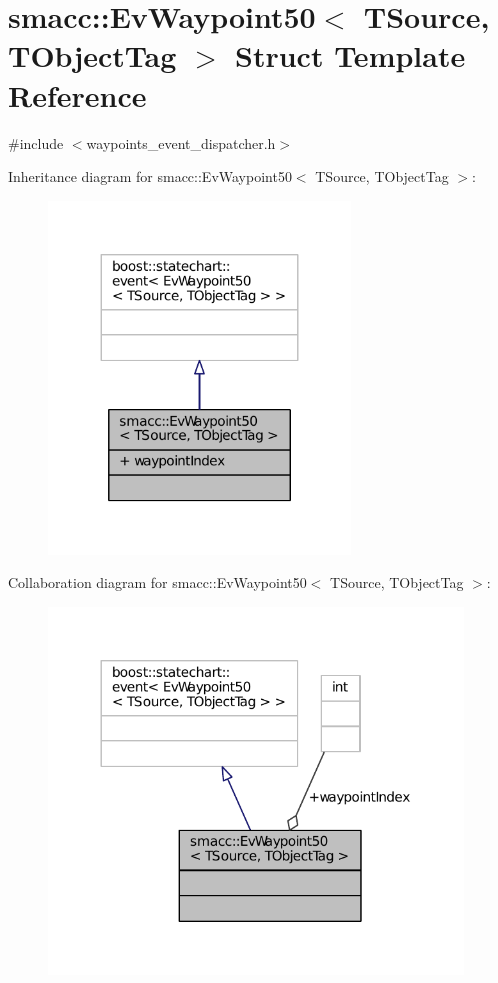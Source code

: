 \hypertarget{structsmacc_1_1EvWaypoint50}{}\section{smacc\+:\+:Ev\+Waypoint50$<$ T\+Source, T\+Object\+Tag $>$ Struct Template Reference}
\label{structsmacc_1_1EvWaypoint50}


{\ttfamily \#include $<$waypoints\+\_\+event\+\_\+dispatcher.\+h$>$}



Inheritance diagram for smacc\+:\+:Ev\+Waypoint50$<$ T\+Source, T\+Object\+Tag $>$\+:
\nopagebreak
\begin{figure}[H]
\begin{center}
\leavevmode
\includegraphics[width=227pt]{structsmacc_1_1EvWaypoint50__inherit__graph}
\end{center}
\end{figure}


Collaboration diagram for smacc\+:\+:Ev\+Waypoint50$<$ T\+Source, T\+Object\+Tag $>$\+:
\nopagebreak
\begin{figure}[H]
\begin{center}
\leavevmode
\includegraphics[width=312pt]{structsmacc_1_1EvWaypoint50__coll__graph}
\end{center}
\end{figure}
